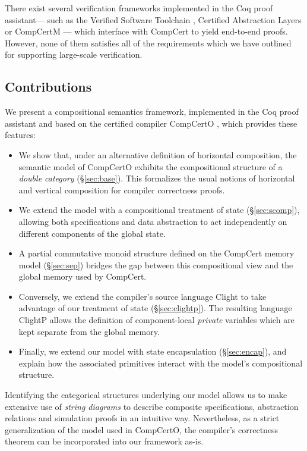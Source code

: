 \documentclass[acmsmall,screen,review,anonymous]{acmart}
\begin{document}
There exist several verification frameworks
implemented in the Coq proof assistant---%
such as the Verified Software Toolchain \cite{vst}, Certified Abstraction Layers \cite{popl15} or
CompCertM \cite{compcertm}---%
which interface with CompCert to yield end-to-end proofs.
However,
none of them satisfies all of
the requirements which we have outlined
for supporting large-scale verification.


\subsection{Contributions} %

We present a compositional semantics framework,
implemented in the Coq proof assistant
and based on the certified compiler CompCertO \cite{compcerto},
which provides these features:
\begin{itemize}
  \item We show that,
    under an alternative definition of horizontal composition,
    the semantic model of CompCertO
    exhibits the compositional structure of a \emph{double category}
    (\S\ref{sec:base}).
    This formalizes 
    the usual notions of horizontal and vertical composition
    for compiler correctness proofs.
  \item We extend the model
    with a compositional treatment of state (\S\ref{sec:scomp}),
    allowing both specifications and data abstraction
    to act independently on different components of the global state.
  \item 
    A partial commutative monoid structure
    defined on the CompCert memory model (\S\ref{sec:sep})
    bridges the gap between this compositional view
    and the global memory used by CompCert.
  \item
    Conversely,
    we extend the compiler's source language Clight
    to take advantage of our treatment of state (\S\ref{sec:clightp}).
    The resulting language ClightP allows the definition of
    component-local \emph{private} variables
    which are kept separate from the global memory.
  \item
    Finally,
    we extend our model with state encapsulation (\S\ref{sec:encap}),
    and explain how the associated primitives
    interact with the model's compositional structure.
\end{itemize}
Identifying the categorical structures underlying our model
allows us to make extensive use of \emph{string diagrams} \cite{dcsd}
to describe composite specifications, abstraction relations and simulation proofs
in an intuitive way.
Nevertheless, as a strict generalization of the model used in CompCertO,
the compiler's correctness theorem
can be incorporated into our framework as-is.
\end{document}
